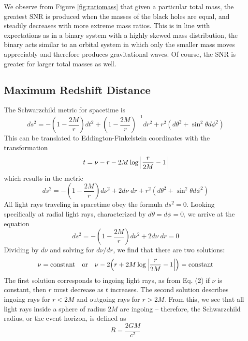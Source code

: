 \documentclass{article}
\begin{document}
We observe from Figure \ref{fig:ratiomass} that given a particular total mass, the greatest SNR is produced when the masses of the black holes are equal, and steadily decreases with more extreme mass ratios. This is in line with expectations as in a binary system with a highly skewed mass distribution, the binary acts similar to an orbital system in which only the smaller mass moves appreciably and therefore produces gravitational waves. Of course, the SNR is greater for larger total masses as well. 

\subsection{Maximum Redshift Distance}

The Schwarzchild metric for spacetime is 
\begin{equation}
    ds^2 = -(1-\frac{2M}{r}) dt^2 + (1 - \frac{2M}{r})^{-1} dr^2 + r^2 (d \theta^2 + \sin^2 \theta d\phi^2)
\end{equation}
This can be translated to Eddington-Finkelstein coordinates with the transformation 
\begin{equation}
    t = \nu - r - 2M \log \abs{\frac{r}{2M}-1}
\end{equation}
which results in the metric
\begin{equation}
    ds^2 = -(1-\frac{2M}{r}) d\nu^2 + 2 d \nu \; dr + r^2 (d\theta^2 + \sin^2 \theta d\phi^2)
\end{equation}
All light rays traveling in spacetime obey the formula $ds^2=0$. Looking specifically at radial light rays, characterized by $d\theta = d\phi = 0$, we arrive at the equation 
\begin{equation}
    ds^2 = -(1-\frac{2M}{r}) d\nu^2 + 2 d\nu \; dr = 0
\end{equation}
Dividing by $d \nu$ and solving for $d\nu/dr$, we find that there are two solutions: 
\begin{equation}
    \nu = \text{constant} \quad \text{or} \quad \nu - 2\Big(r + 2M \log \abs{\frac{r}{2M}-1}\Big) = \text{constant}
\end{equation}
The first solution corresponds to ingoing light rays, as from Eq. (2) if $\nu$ is constant, then $r$ must decrease as $t$ increases. The second solution describes ingoing rays for $r<2M$ and outgoing rays for $r>2M$. From this, we see that all light rays inside a sphere of radius $2M$ are ingoing -- therefore, the Schwarzchild radius, or the event horizon, is defined as 
\begin{equation}
    R = \frac{2GM}{c^2}
\end{equation}
\end{document}
